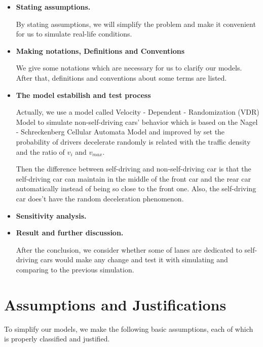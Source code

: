 \documentclass{mcmthesis}
\numberwithin{equation}{section}
\newcommand{\scite}[1]{\textsuperscript{\cite{#1}}}%
\begin{document}
			\begin{itemize}
				\item \textbf{Stating assumptions.}

					By stating assumptions, we will simplify the problem and make it convenient for us to simulate real-life conditions.

				\item \textbf{Making notations, Definitions and Conventions}

					We give some notations which are necessary for us to clarify our models. After that, definitions and conventions about some terms are listed.

				\item \textbf{The model estabilish and test process}

					Actually, we use a model called Velocity - Dependent - Randomization (VDR) Model\scite{3} to simulate non-self-driving cars' behavior which is based on the Nagel - Schreckenberg Cellular Automata Model and improved by set the probability of drivers decelerate randomly is related with the traffic density and the ratio of $v_{i}$ and $v_{max}$.

					Then the difference between self-driving and non-self-driving car is that the self-driving car can maintain in the middle of the front car and the rear car automatically instead of being so close to the front one. Also, the self-driving car does't have the random deceleration phenomenon.

				\item \textbf{Sensitivity analysis.}


				\item \textbf{Result and further discussion.}

					After the conclusion, we consider whether some of lanes are dedicated to self-driving cars would make any change and test it with simulating  and comparing to the previous simulation. 

			\end{itemize}

	\section{Assumptions and Justifications}
		To simplify our models, we make the following basic assumptions, each of which is properly classified and justified.
\end{document}
